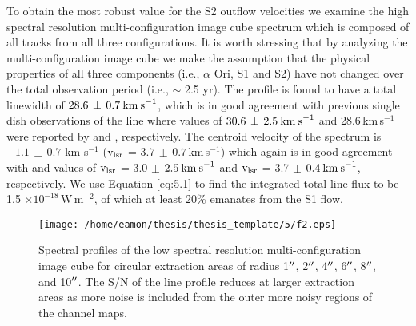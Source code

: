 To obtain the most robust value for the S2 outflow velocities we examine the high spectral resolution multi-configuration image cube spectrum which is composed of all tracks from all three configurations. It is worth stressing that by analyzing the multi-configuration image cube we make the assumption that the physical properties of all three components (i.e., $\alpha$ Ori, S1 and S2) have not changed over the total observation period (i.e., $\sim$ 2.5 yr). The profile is found to have a total linewidth of $28.6\,\pm \,0.7\>{\rm km\>s}^{-1}$, which is in good agreement with previous single dish observations of the line where values of $30.6\,\pm \,2.5\>{\rm km\>s}^{-1}$ and  28.6\,km\,s$^{-1}$ were reported by \cite{knapp_1980} and \cite{huggins_1987}, respectively. The centroid velocity of the spectrum is  $-1.1\,\pm\,0.7$ km s$^{-1}$ ($\rm{v_{\rm{lsr}}}$ = $3.7\,\pm \,0.7$\,km\,s$^{-1}$) which again is in good agreement with \cite{knapp_1980} and \cite{huggins_1987} values of $\rm{v_{lsr}}$ = 3.0 $\pm$ $2.5\>{\rm km\>s}^{-1}$ and $\rm{v_{lsr}}$ = 3.7 $\pm$ $0.4\>{\rm km\>s}^{-1}$, respectively. We use Equation \ref{eq:5.1} to find the integrated total line flux to be 1.5 $\times 10^{-18}$\,W\,m$^{-2}$, of which at least 20\% emanates from the S1 flow.

\begin{figure}[!ht]
\centering 
\texttt{[image: /home/eamon/thesis/thesis\_template/5/f2.eps]}
\caption[Spectra extracted over various regions]{Spectral profiles of the low spectral resolution multi-configuration image cube for circular extraction areas of radius 1$^{\prime\prime}$, 2$^{\prime\prime}$, 4$^{\prime\prime}$, 6$^{\prime\prime}$, 8$^{\prime\prime}$, and 10$^{\prime\prime}$. The S/N of the line profile reduces at larger extraction areas as more noise is included from the outer more noisy regions of the channel maps.}
\label{fig:5.5}
\end{figure}

